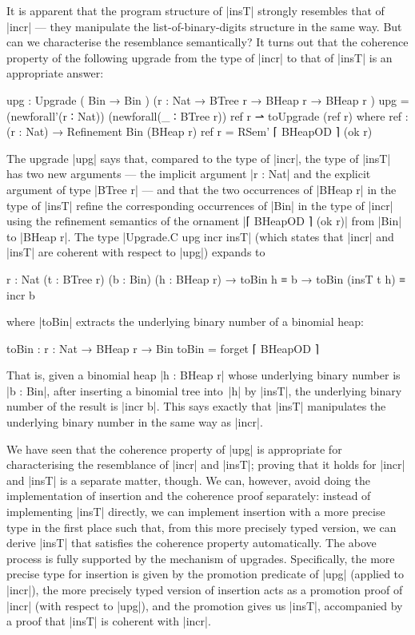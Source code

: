 It is apparent that the program structure of |insT| strongly resembles that of |incr| --- they manipulate the list-of-binary-digits structure in the same way.
But can we characterise the resemblance semantically?
It turns out that the coherence property of the following upgrade from the type of |incr| to that of |insT| is an appropriate answer:
\begin{code}
upg : Upgrade  (                       Bin      → Bin      )
               ({r : Nat} → BTree r →  BHeap r  → BHeap r  )
upg = (newforall'(r ∶ Nat)) (newforall(_ ∶ BTree r)) ref r ⇀ toUpgrade (ref r)
  where  ref : (r : Nat) → Refinement Bin (BHeap r)
         ref r = RSem' ⌈ BHeapOD ⌉ (ok r)
\end{code}
The upgrade |upg| says that, compared to the type of |incr|, the type of |insT| has two new arguments --- the implicit argument |r : Nat| and the explicit argument of type |BTree r| --- and that the two occurrences of |BHeap r| in the type of |insT| refine the corresponding occurrences of |Bin| in the type of |incr| using the refinement semantics of the ornament |⌈ BHeapOD ⌉ (ok r)| from |Bin| to |BHeap r|.
The type |Upgrade.C upg incr insT| (which states that |incr| and |insT| are coherent with respect to |upg|) expands to
\begin{code}
{r : Nat} (t : BTree r) (b : Bin) (h : BHeap r) →
toBin h ≡ b → toBin (insT t h) ≡ incr b
\end{code}
where |toBin| extracts the underlying binary number of a binomial heap:
\begin{code}
toBin : {r : Nat} → BHeap r → Bin
toBin = forget ⌈ BHeapOD ⌉
\end{code}
That is, given a binomial heap |h : BHeap r| whose underlying binary number is |b : Bin|, after inserting a binomial tree into~|h| by |insT|, the underlying binary number of the result is |incr b|.
This says exactly that |insT| manipulates the underlying binary number in the same way as |incr|.

We have seen that the coherence property of |upg| is appropriate for characterising the resemblance of |incr| and |insT|; proving that it holds for |incr| and |insT| is a separate matter, though.
We can, however, avoid doing the implementation of insertion and the coherence proof separately:
instead of implementing |insT| directly, we can implement insertion with a more precise type in the first place such that, from this more precisely typed version, we can derive |insT| that satisfies the coherence property automatically.
The above process is fully supported by the mechanism of upgrades.
Specifically, the more precise type for insertion is given by the promotion predicate of |upg| (applied to |incr|), the more precisely typed version of insertion acts as a promotion proof of |incr| (with respect to |upg|), and the promotion gives us |insT|, accompanied by a proof that |insT| is coherent with |incr|.

